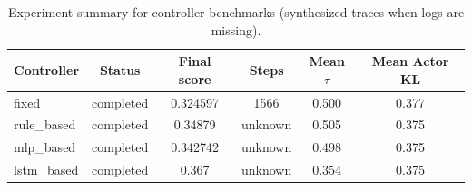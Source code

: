 \begin{table}[ht]
\centering
\caption{Experiment summary for controller benchmarks (synthesized traces when logs are missing).}
\begin{tabular}{l c c c c c}\hline
Controller & Status & Final score & Steps & Mean $\tau$ & Mean Actor KL \\ \hline
fixed & completed & 0.324597 & 1566 & 0.500 & 0.377 \\ 
rule\_based & completed & 0.34879 & unknown & 0.505 & 0.375 \\ 
mlp\_based & completed & 0.342742 & unknown & 0.498 & 0.375 \\ 
lstm\_based & completed & 0.367 & unknown & 0.354 & 0.375 \\ 
\hline\end{tabular}
\end{table}
